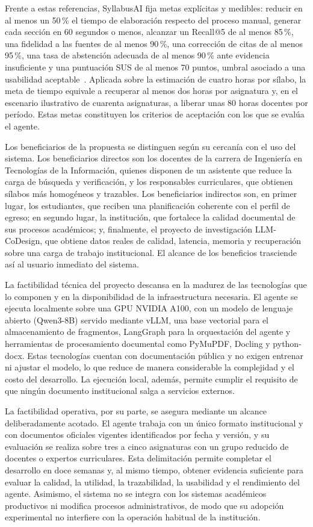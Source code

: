 Frente a estas referencias, SyllabusAI fija metas explícitas y medibles: reducir en al menos un 50\,\% el tiempo de elaboración respecto del proceso manual, generar cada sección en 60 segundos o menos, alcanzar un Recall@5 de al menos 85\,\%, una fidelidad a las fuentes de al menos 90\,\%, una corrección de citas de al menos 95\,\%, una tasa de abstención adecuada de al menos 90\,\% ante evidencia insuficiente y una puntuación SUS de al menos 70 puntos, umbral asociado a una usabilidad aceptable~\cite{bangor2008sus}. Aplicada sobre la estimación de cuatro horas por sílabo, la meta de tiempo equivale a recuperar al menos dos horas por asignatura y, en el escenario ilustrativo de cuarenta asignaturas, a liberar unas 80 horas docentes por período. Estas metas constituyen los criterios de aceptación con los que se evalúa el agente.

Los beneficiarios de la propuesta se distinguen según su cercanía con el uso del sistema. Los beneficiarios directos son los docentes de la carrera de Ingeniería en Tecnologías de la Información, quienes disponen de un asistente que reduce la carga de búsqueda y verificación, y los responsables curriculares, que obtienen sílabos más homogéneos y trazables. Los beneficiarios indirectos son, en primer lugar, los estudiantes, que reciben una planificación coherente con el perfil de egreso; en segundo lugar, la institución, que fortalece la calidad documental de sus procesos académicos; y, finalmente, el proyecto de investigación LLM-CoDesign, que obtiene datos reales de calidad, latencia, memoria y recuperación sobre una carga de trabajo institucional. El alcance de los beneficios trasciende así al usuario inmediato del sistema.

La factibilidad técnica del proyecto descansa en la madurez de las tecnologías que lo componen y en la disponibilidad de la infraestructura necesaria. El agente se ejecuta localmente sobre una GPU NVIDIA A100, con un modelo de lenguaje abierto (Qwen3-8B) servido mediante vLLM, una base vectorial para el almacenamiento de fragmentos, LangGraph para la orquestación del agente y herramientas de procesamiento documental como PyMuPDF, Docling y python-docx. Estas tecnologías cuentan con documentación pública y no exigen entrenar ni ajustar el modelo, lo que reduce de manera considerable la complejidad y el costo del desarrollo. La ejecución local, además, permite cumplir el requisito de que ningún documento institucional salga a servicios externos.

La factibilidad operativa, por su parte, se asegura mediante un alcance deliberadamente acotado. El agente trabaja con un único formato institucional y con documentos oficiales vigentes identificados por fecha y versión, y su evaluación se realiza sobre tres a cinco asignaturas con un grupo reducido de docentes o expertos curriculares. Esta delimitación permite completar el desarrollo en doce semanas y, al mismo tiempo, obtener evidencia suficiente para evaluar la calidad, la utilidad, la trazabilidad, la usabilidad y el rendimiento del agente. Asimismo, el sistema no se integra con los sistemas académicos productivos ni modifica procesos administrativos, de modo que su adopción experimental no interfiere con la operación habitual de la institución.

